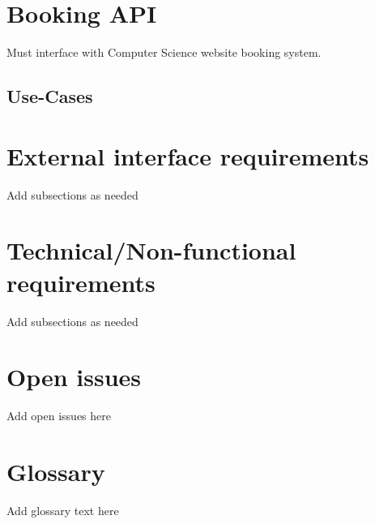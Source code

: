\documentclass[10pt,a4paper]{article}
\begin{document}
	\section*{Booking API}
	Must interface with Computer Science website booking system.
\subsection{Use-Cases}
\section{External interface requirements}
Add subsections as needed
\section{Technical/Non-functional requirements}
Add subsections as needed
\section{Open issues}
Add open issues here
\section{Glossary}
Add glossary text here
\end{document}

